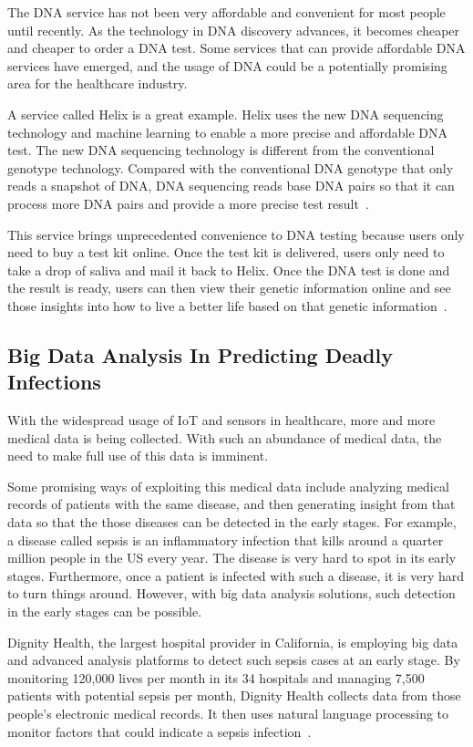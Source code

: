 The DNA service has not been very 
affordable and convenient for 
most people until recently. 
As the technology in DNA discovery advances, 
it becomes cheaper 
and cheaper to order a DNA test. 
Some services that can provide affordable 
DNA services have emerged, and the usage 
of DNA could be a potentially 
promising area for the 
healthcare industry.

A service called Helix is a great example. Helix 
uses the new DNA sequencing 
technology and machine learning to enable a more 
precise and affordable DNA 
test. The new DNA sequencing technology is 
different from the conventional 
genotype technology. Compared with the 
conventional DNA genotype that only 
reads a snapshot of DNA, DNA sequencing 
reads base DNA pairs so 
that it can process more DNA pairs and 
provide a more precise test 
result~\cite{helix}. 

This service brings unprecedented convenience to
 DNA testing because users 
only need to buy a test kit online. Once the test 
kit is delivered, users 
only need to take a drop of saliva and mail it 
back to Helix. Once the DNA test 
is done and the result is ready, users can then 
view their genetic information 
online and see those insights into how to live a 
better life based on that
genetic information~\cite{helix}.

\subsection{Big Data Analysis In Predicting Deadly Infections}
With the widespread usage of IoT and sensors in healthcare, more and more 
medical data is being collected. With such an abundance of medical data, 
the need 
to make full use of this data is imminent. 

Some promising ways of exploiting this medical 
data include analyzing 
medical records of patients with the same disease, 
and then generating 
insight from that data so that the those diseases 
can be detected in the early 
stages. For example, a disease called sepsis is an inflammatory 
infection that kills around a 
quarter million people in the US every year. 
The disease is very hard to spot in its 
early stages. Furthermore, once a patient is infected with such a 
disease, it is very hard 
to turn things around. However, with big data 
analysis solutions, such 
detection in the early stages can be possible. 

Dignity Health, the largest hospital provider in 
California, is employing big data 
and advanced analysis platforms to detect such 
sepsis cases at an early stage. 
By monitoring 120,000 lives per month in its 34 
hospitals and managing 7,500 
patients with potential sepsis per month, 
Dignity Health collects data from 
those people's electronic medical records. 
It then uses natural language 
processing to monitor factors that could indicate 
a sepsis infection~\cite{sas}. 

